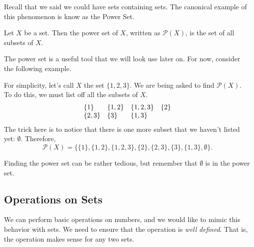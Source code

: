 Recall that we said we could have sets containing sets. The canonical example of this phenomenon is know as the Power Set.
\begin{definition}{}
	Let $X$ be a set. Then the power set of $X$, written as $\mathcal{P}(X)$, is the set of all subsets of $X$.
\end{definition}
The power set is a useful tool that we will look use later on. For now, consider the following example.
\begin{example}{}
	For simplicity, let's call $X$ the set $\{1,2,3\}$. We are being asked to find $\mathcal{P}(X)$. To do this, we must list off all the subsets of $X$.
	\[
		\begin{array}{l l l l}
			\{1\}   & \{1,2\} & \{1,2,3\} & \{2\} \\
			\{2,3\} & \{3\}   & \{1,3\}   &
		\end{array}
	\]
    The trick here is to notice that there is one more subset that we haven't listed yet: $\emptyset$. Therefore,
    \[
        \mathcal{P}(X) = \{\{1\}, \{1,2\}, \{1,2,3\}, \{2\},\{2,3\}, \{3\}, \{1,3\}, \emptyset\}.
    \]
\end{example}
Finding the power set can be rather tedious, but remember that $\emptyset$ is in the power set.

\subsection*{Operations on Sets}
We can perform basic operations on numbers, and we would like to mimic this behavior with sets. We need to ensure that the operation is \textit{well defined}. That is, the operation makes sense for any two sets.
